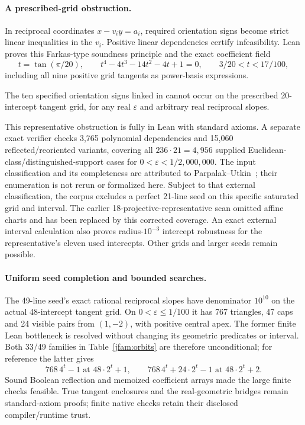 \paragraph{A prescribed-grid obstruction.}
In reciprocal coordinates $x-v_i y=a_i$, required orientation signs become strict linear inequalities in the $v_i$. Positive linear dependencies certify infeasibility. Lean proves this Farkas-type soundness principle and the exact coefficient field
\[
 t=\tan(\pi/20),\qquad t^4-4t^3-14t^2-4t+1=0,\qquad3/20<t<17/100,
\]
including all nine positive grid tangents as power-basis expressions.
\begin{proposition}\label{j:obstruction}
The ten specified orientation signs linked in  cannot occur on the prescribed 20-intercept tangent grid, for any real $\varepsilon$ and arbitrary real reciprocal slopes.
\end{proposition}
This representative obstruction is fully in Lean with standard axioms. A separate exact verifier checks 3,765 polynomial dependencies and 15,060 reflected/reoriented variants, covering all $236\cdot21=4,956$ supplied Euclidean-class/distinguished-support cases for $0<\varepsilon<1/2{,}000{,}000$. The input classification and its completeness are attributed to Parpalak--Utkin~\cite{parpalakutkinEnumeration2026}; their enumeration is not rerun or formalized here. Subject to that external classification, the corpus excludes a perfect 21-line seed on this specific saturated grid and interval. The earlier 18-projective-representative scan omitted affine charts and has been replaced by this corrected coverage. An exact external interval calculation also proves radius-$10^{-3}$ intercept robustness for the representative's eleven used intercepts. Other grids and larger seeds remain possible.

\paragraph{Uniform seed completion and bounded searches.}
The 49-line seed's exact rational reciprocal slopes have denominator $10^{10}$ on the actual 48-intercept tangent grid. On $0<\varepsilon\le1/100$ it has 767 triangles, 47 caps and 24 visible pairs from $(1,-2)$, with positive central apex. The former finite Lean bottleneck is resolved without changing its geometric predicates or interval. Both 33/49 families in Table~\ref{jfam:orbits} are therefore unconditional; for reference the latter gives
\begin{equation}\label{j:exact49}
 768\,4^t-1\text{ at }48\cdot2^t+1,\qquad
 768\,4^t+24\cdot2^t-1\text{ at }48\cdot2^t+2.
\end{equation}
Sound Boolean reflection and memoized coefficient arrays made the large finite checks feasible. True tangent enclosures and the real-geometric bridges remain standard-axiom proofs; finite native checks retain their disclosed compiler/runtime trust.

